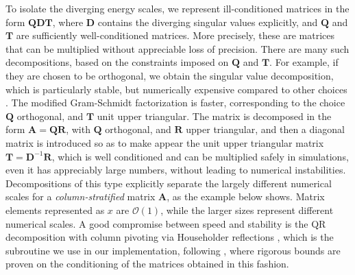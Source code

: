 To isolate the diverging energy scales, we represent ill-conditioned matrices in the form $\bm Q \bm D \bm T$, where $\bm D$ contains the diverging singular values explicitly, and $\bm Q$ and $\bm T$ are sufficiently well-conditioned matrices.
More precisely, these are matrices that can be multiplied without appreciable loss of precision.
There are many such decompositions, based on the constraints imposed on $\bm Q$ and $\bm T$.
For example, if they are chosen to be orthogonal, we obtain the singular value decomposition, which is particularly stable, but numerically expensive compared to other choices \cite{hanke_electronic_nodate}.
The modified Gram-Schmidt factorization is faster, corresponding to the choice $\bm Q$ orthogonal, and $\bm T$ unit upper triangular.
The matrix is decomposed in the form $\bm A = \bm Q \bm R$, with $\bm Q$ orthogonal, and $\bm R$ upper triangular, and then a diagonal matrix is introduced so as to make appear the unit upper triangular matrix $\bm  T = \bm D^{-1} \bm R$, which is well conditioned and can be multiplied safely in simulations, even it has appreciably large numbers, without leading to numerical  instabilities.
Decompositions of this type explicitly separate the largely different numerical scales for a \emph{column-stratified} matrix $\bm A$, as the example below shows.
Matrix elements represented as $x$ are $\mathcal{O}(1)$, while the larger sizes represent different numerical scales.
A good compromise between speed and stability is the QR decomposition with column pivoting via Householder reflections \cite{newman_computational_2012}, which is the subroutine we use in our implementation, following \cite{bai_stable_2011}, where rigorous bounds are proven on the conditioning of the matrices obtained in this fashion.

